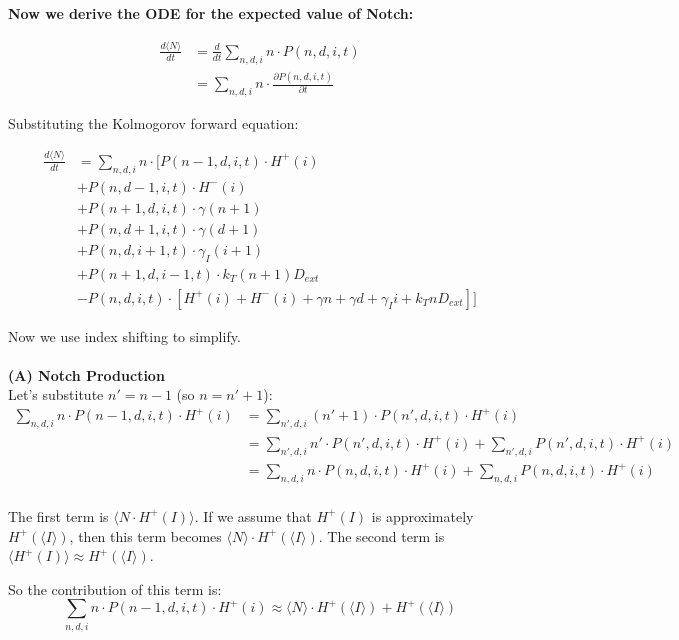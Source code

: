 \documentclass{article}
\begin{document}
\begin{flushleft}
\textbf{Now we derive the ODE for the expected value of Notch:}

\begin{align*}
\frac{d\langle N \rangle}{dt} &= \frac{d}{dt}\sum_{n,d,i} n \cdot P(n,d,i,t) \\
&= \sum_{n,d,i} n \cdot \frac{\partial P(n,d,i,t)}{\partial t}
\end{align*}

Substituting the Kolmogorov forward equation:

\begin{align*}
\frac{d\langle N \rangle}{dt} &= \sum_{n,d,i} n \cdot \Big[ P(n-1,d,i,t) \cdot H^+(i) \\
&+ P(n,d-1,i,t) \cdot H^-(i) \\
&+ P(n+1,d,i,t) \cdot \gamma(n+1) \\
&+ P(n,d+1,i,t) \cdot \gamma(d+1) \\
&+ P(n,d,i+1,t) \cdot \gamma_I(i+1) \\
&+ P(n+1,d,i-1,t) \cdot k_T(n+1)D_{ext} \\
&- P(n,d,i,t) \cdot [H^+(i) + H^-(i) + \gamma n + \gamma d + \gamma_I i + k_T n D_{ext}] \Big]
\end{align*}

Now we use index shifting to simplify.\\~\\

\textbf{(A) Notch Production} \\
Let's substitute $n' = n-1$ (so $n = n'+1$):
\begin{align*}
\sum_{n,d,i} n \cdot P(n-1,d,i,t) \cdot H^+(i) &= \sum_{n',d,i} (n'+1) \cdot P(n',d,i,t) \cdot H^+(i) \\
&= \sum_{n',d,i} n' \cdot P(n',d,i,t) \cdot H^+(i) + \sum_{n',d,i} P(n',d,i,t) \cdot H^+(i) \\
&= \sum_{n,d,i} n \cdot P(n,d,i,t) \cdot H^+(i) + \sum_{n,d,i} P(n,d,i,t) \cdot H^+(i) \\
\end{align*}

The first term is $\langle N \cdot H^+(I) \rangle$. If we assume that $H^+(I)$ is approximately $H^+(\langle I \rangle)$, then this term becomes $\langle N \rangle \cdot H^+(\langle I \rangle)$. The second term is $\langle H^+(I) \rangle \approx H^+(\langle I \rangle)$. 

So the contribution of this term is:
\[
\sum_{n,d,i} n \cdot P(n-1,d,i,t) \cdot H^+(i) \approx \langle N \rangle \cdot H^+(\langle I \rangle) + H^+(\langle I \rangle)
\]


\end{flushleft}
\end{document}
